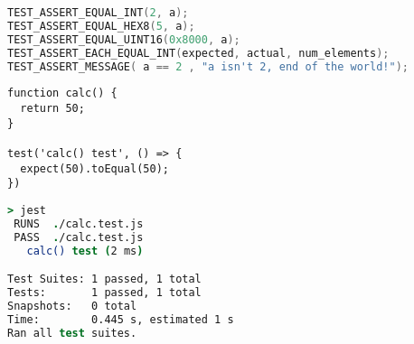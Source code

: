 \begin{lstlisting}[language=c, label={lst:unity-more-test-assert}, caption=More advanced Unity Assertions
\cite{unity-github}]
TEST_ASSERT_EQUAL_INT(2, a);
TEST_ASSERT_EQUAL_HEX8(5, a);
TEST_ASSERT_EQUAL_UINT16(0x8000, a);
TEST_ASSERT_EACH_EQUAL_INT(expected, actual, num_elements);
TEST_ASSERT_MESSAGE( a == 2 , "a isn't 2, end of the world!");
\end{lstlisting}

\begin{lstlisting}[style=ES6, label=lst:jest-example, caption={Jest Unit Testing Example}]
function calc() {
  return 50;
}

test('calc() test', () => {
  expect(50).toEqual(50);
})
\end{lstlisting}

\begin{lstlisting}[language=csh, label=lst:jest-output, caption={Jest Unit
Testing Example Output}]
> jest
 RUNS  ./calc.test.js
 PASS  ./calc.test.js
   calc() test (2 ms)

Test Suites: 1 passed, 1 total
Tests:       1 passed, 1 total
Snapshots:   0 total
Time:        0.445 s, estimated 1 s
Ran all test suites.
\end{lstlisting}
